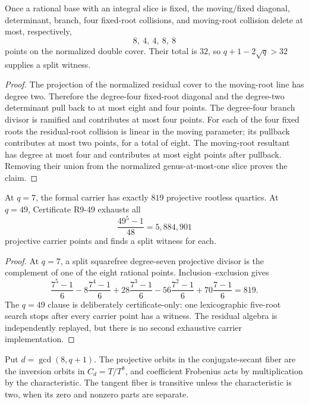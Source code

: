 \begin{proposition}\label{prop:r9-deletion}%
%
Once a rational base with an integral slice is fixed, the moving/fixed
diagonal, determinant, branch, four fixed-root collisions, and
moving-root collision delete at most, respectively,
\[
       8,\ 4,\ 4,\ 8,\ 8
\]
points on the normalized double cover.  Their total is $32$, so
$q+1-2\sqrt q>32$ supplies a split witness.
\end{proposition}

\begin{proof}
The projection of the normalized residual cover to the moving-root line
has degree two.  Therefore the degree-four fixed-root diagonal and the
degree-two determinant pull back to at most eight and four points.  The
degree-four branch divisor is ramified and contributes at most four
points.  For each of the four fixed roots the residual-root collision is
linear in the moving parameter; its pullback contributes at most two
points, for a total of eight.  The moving-root resultant has degree at
most four and contributes at most eight points after pullback.  Removing
their union from the normalized genus-at-most-one slice proves the claim.
\end{proof}

\begin{proposition}
\label{prop:r9-char7}%
%
At $q=7$, the formal carrier has exactly $819$ projective rootless
quartics.  At $q=49$, Certificate R9-49 exhausts all
\[
       \frac{49^5-1}{48}=5{,}884{,}901
\]
projective carrier points and finds a split witness for each.
\end{proposition}

\begin{proof}
At $q=7$, a split squarefree degree-seven projective divisor is the
complement of one of the eight rational points.  Inclusion--exclusion
gives
\[
\frac{7^5-1}{6}-8\frac{7^4-1}{6}
+28\frac{7^3-1}{6}-56\frac{7^2-1}{6}
+70\frac{7-1}{6}=819.
\]
The $q=49$ clause is deliberately certificate-only: one lexicographic
five-root search stops after every carrier point has a witness.  The
residual algebra is independently replayed, but there is no second
exhaustive carrier implementation.
\end{proof}

\begin{proposition}\label{prop:r9-orbits}%
%
Put $d=\gcd(8,q+1)$.  The projective orbits in the conjugate-secant fiber
are the inversion orbits in $C_d=T/T^8$, and coefficient Frobenius acts by
multiplication by the characteristic.  The tangent fiber is transitive
unless the characteristic is two, when its zero and nonzero parts are
separate.
\end{proposition}

